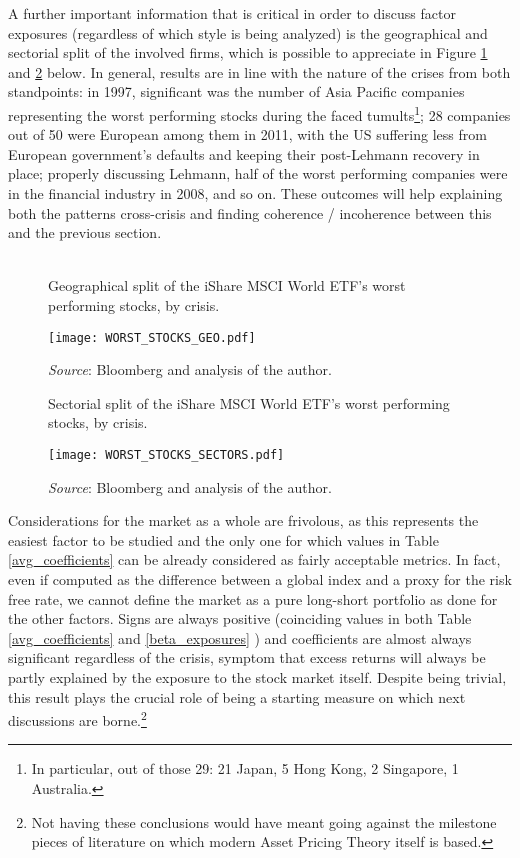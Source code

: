 \documentclass[12pt]{article}
\begin{document}
A further important information that is critical in order to discuss factor exposures (regardless of which style is being analyzed) is the geographical and sectorial split of the involved firms, which is possible to appreciate in Figure \ref{worst_geo} and \ref{worst_sector} below. In general, results are in line with the nature of the crises from both standpoints: in 1997, significant was the number of Asia Pacific companies representing the worst performing stocks during the faced tumults\footnote{In particular, out of those 29: 21 Japan, 5 Hong Kong, 2 Singapore, 1 Australia.}; 28 companies out of 50 were European among them in 2011, with the US suffering less from European government's defaults and keeping their post-Lehmann recovery in place; properly discussing Lehmann, half of the worst performing companies were in the financial industry in 2008, and so on. These outcomes will help explaining both the patterns cross-crisis and finding coherence / incoherence between this and the previous section. \\ \\

\begin{figure}[H]
\begin{center}
\caption{Geographical split of the iShare MSCI World ETF's worst performing stocks, by crisis.}
\texttt{[image: WORST\_STOCKS\_GEO.pdf]}
\caption*{\textit{Source}: Bloomberg and analysis of the author.}
\label{worst_geo}
\end{center}
\end{figure}

\begin{figure}[H]
\begin{center}
\caption{Sectorial split of the iShare MSCI World ETF's worst performing stocks, by crisis.}
\texttt{[image: WORST\_STOCKS\_SECTORS.pdf]}
\caption*{\textit{Source}: Bloomberg and analysis of the author.}
\label{worst_sector}
\end{center}
\end{figure}

Considerations for the market as a whole are frivolous, as this represents the easiest factor to be studied and the only one for which values in Table \ref{avg_coefficients} can be already considered as fairly acceptable metrics. In fact, even if computed as the difference between a global index and a proxy for the risk free rate, we cannot define the market as a pure long-short portfolio as done for the other factors. Signs are always positive (coinciding values in both Table \ref{avg_coefficients} and \ref{beta_exposures} ) and coefficients are almost always significant regardless of the crisis, symptom that excess returns will always be partly explained by the exposure to the stock market itself. Despite being trivial, this result plays the crucial role of being a starting measure on which next discussions are borne.\footnote{Not having these conclusions would have meant going against the milestone pieces of literature on which modern Asset Pricing Theory itself is based.}
\end{document}
